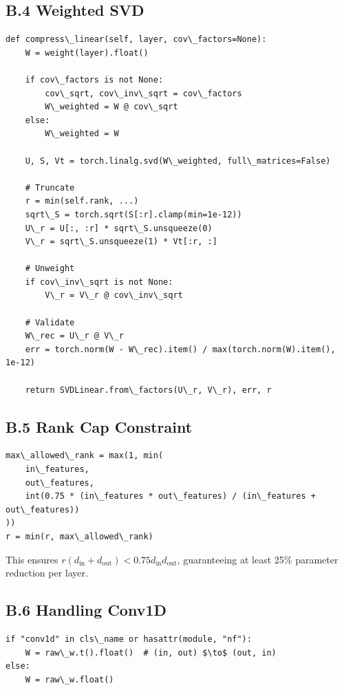 \subsection{B.4 Weighted SVD}

\begin{lstlisting}
def compress\_linear(self, layer, cov\_factors=None):
    W = weight(layer).float()
    
    if cov\_factors is not None:
        cov\_sqrt, cov\_inv\_sqrt = cov\_factors
        W\_weighted = W @ cov\_sqrt
    else:
        W\_weighted = W
    
    U, S, Vt = torch.linalg.svd(W\_weighted, full\_matrices=False)
    
    # Truncate
    r = min(self.rank, ...)
    sqrt\_S = torch.sqrt(S[:r].clamp(min=1e-12))
    U\_r = U[:, :r] * sqrt\_S.unsqueeze(0)
    V\_r = sqrt\_S.unsqueeze(1) * Vt[:r, :]
    
    # Unweight
    if cov\_inv\_sqrt is not None:
        V\_r = V\_r @ cov\_inv\_sqrt
    
    # Validate
    W\_rec = U\_r @ V\_r
    err = torch.norm(W - W\_rec).item() / max(torch.norm(W).item(), 1e-12)
    
    return SVDLinear.from\_factors(U\_r, V\_r), err, r
\end{lstlisting}

\subsection{B.5 Rank Cap Constraint}

\begin{lstlisting}
max\_allowed\_rank = max(1, min(
    in\_features,
    out\_features,
    int(0.75 * (in\_features * out\_features) / (in\_features + out\_features))
))
r = min(r, max\_allowed\_rank)
\end{lstlisting}

This ensures $r(d_\text{in} + d_\text{out}) < 0.75 d_\text{in} d_\text{out}$, 
guaranteeing at least 25\% parameter reduction per layer.

\subsection{B.6 Handling Conv1D}

\begin{lstlisting}
if "conv1d" in cls\_name or hasattr(module, "nf"):
    W = raw\_w.t().float()  # (in, out) $\to$ (out, in)
else:
    W = raw\_w.float()
\end{lstlisting}

